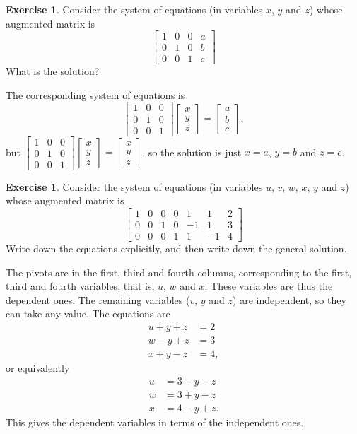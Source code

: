 \documentclass[a4paper]{book}
\newcommand{\bbm}       {\begin{bmatrix}}
\newcommand{\ebm}       {\end{bmatrix}}
\renewcommand{\:}{\colon}
\theoremstyle{definition}
\newtheorem{exercise}[theorem]{Exercise}
\renewenvironment{solution}{\SolutionInline}{\endSolutionInline}
\begin{document}
\begin{exercise}
Consider the system of equations (in variables $x$, $y$ and $z$) whose
augmented matrix is
 \[ \left[\begin{array}{ccc|c}
   1&0&0&a \\
   0&1&0&b \\
   0&0&1&c
 \end{array}\right] \]
 What is the solution?
\end{exercise}
\begin{solution}
 The corresponding system of equations is 
 \[ \bbm 1&0&0\\0&1&0\\0&0&1\ebm \bbm x\\ y\\ z\ebm = 
     \bbm a\\ b\\ c\ebm,
 \]
 but
 $\bbm 1&0&0\\0&1&0\\0&0&1\ebm\bbm x\\ y\\ z\ebm=\bbm x\\ y\\ z\ebm$,
 so the solution is just $x=a$, $y=b$ and $z=c$.
\end{solution}
\begin{exercise}
 Consider the system of equations (in variables $u$, $v$, $w$, $x$,
 $y$ and $z$) whose augmented matrix is 
 \[ \left[\begin{array}{cccccc|c}
   1&0&0&0& 1& 1 & 2 \\
   0&0&1&0&-1& 1 & 3 \\
   0&0&0&1& 1&-1 & 4
 \end{array}\right] \]
 Write down the equations explicitly, and then write down the general
 solution.  
\end{exercise}
\begin{solution}
 The pivots are in the first, third and fourth columns, corresponding
 to the first, third and fourth variables, that is, $u$, $w$ and $x$.
 These variables are thus the dependent ones.  The remaining variables
 ($v$, $y$ and $z$) are independent, so they can take any value.  The
 equations are
 \begin{align*}
  u+y+z &= 2 \\
  w-y+z &= 3 \\
  x+y-z &= 4,
 \end{align*}
 or equivalently
 \begin{align*}
  u &= 3-y-z \\
  w &= 3+y-z \\
  x &= 4-y+z.
 \end{align*}
 This gives the dependent variables in terms of the independent ones.
\end{solution}
\end{document}
